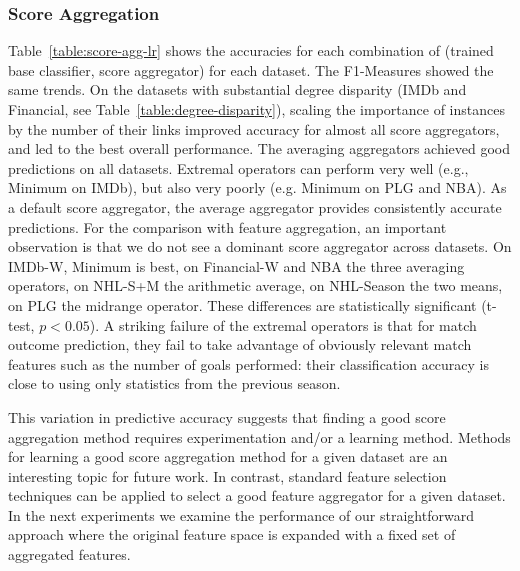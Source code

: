 \documentclass[conference]{IEEEtran}
\begin{document}
\subsubsection{Score Aggregation} Table~\ref{table:score-agg-lr} shows the accuracies for each combination of (trained base classifier, score aggregator) for each dataset. The F1-Measures showed the same trends. On the datasets with substantial degree disparity (IMDb and Financial, see Table~\ref{table:degree-disparity}), scaling the importance of instances by the number of their links improved accuracy for almost all score aggregators, and led to the best overall performance. The averaging aggregators achieved good predictions on all datasets. Extremal operators can perform very well (e.g., Minimum on IMDb), but also very poorly (e.g. Minimum on PLG and NBA). As a default score aggregator, the average aggregator provides consistently accurate predictions. For the comparison with feature aggregation, an important observation is that we do not see a dominant score aggregator across datasets. On IMDb-W, Minimum is best, on Financial-W and NBA the three averaging operators, on NHL-S+M the arithmetic average, on NHL-Season the two means, on PLG the midrange operator. These differences are statistically significant (t-test, $p<0.05$). A striking failure of the extremal operators is that for match outcome prediction, they fail to take advantage of obviously relevant match features such as the number of goals performed: their classification accuracy is close to using only statistics from the previous season.

This variation in predictive accuracy suggests that finding a good score aggregation method requires experimentation and/or a learning method. Methods for learning a good score aggregation method for a given dataset are an interesting topic for future work. In contrast, standard feature selection techniques can be applied to select a good feature aggregator for a given dataset. In the next experiments we examine the performance of our straightforward approach where the original feature space is expanded with a fixed set of aggregated features.


\end{document}
